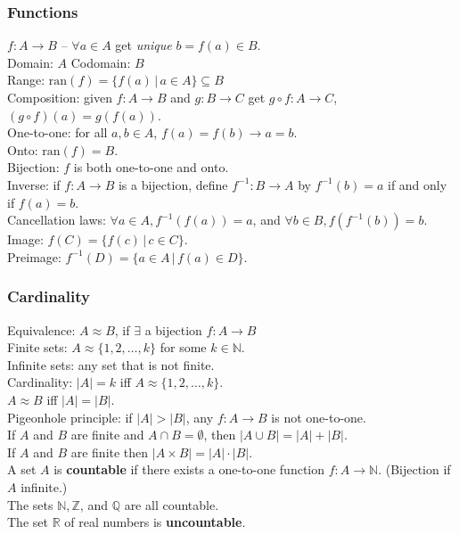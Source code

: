\documentclass[letterpaper,8pt,landscape]{article}
\begin{document}
\begin{multicols}{3}
\subsubsection*{Functions}
$f:A\to B$ -- $\forall a\in A$ get {\em unique} $b=f(a)\in B$.\\
Domain: $A$ \hspace{16pt} Codomain: $B$\\
Range: $\mathrm{ran}(f) = \{f(a)\,|\,a\in A\}\subseteq B$\\
Composition: given $f:A\to B$ and $g:B\to C$ get $g\circ f:A\to C$, $(g\circ f)(a) = g(f(a))$.\\
One-to-one: for all $a,b\in A$, $f(a)=f(b) \to a=b$.\\
Onto: $\mathrm{ran}(f) = B$.\\
Bijection: $f$ is both one-to-one and onto.\\
Inverse: if $f:A\to B$ is a bijection, define $f^{-1}:B\to A$ by $f^{-1}(b)=a$ if and only if $f(a)=b$.\\
Cancellation laws: $\forall a\in A, f^{-1}(f(a))=a$, and $\forall b\in B, f(f^{-1}(b))=b$.\\
Image:  $f(C) = \{f(c)\,|\, c\in C\}$.\\
Preimage: $f^{-1}(D) = \{a\in A\,|\, f(a)\in D\}$.

\subsubsection*{Cardinality}
Equivalence: $A\approx B$, if $\exists$ a bijection $f:A\to B$\\
Finite sets: $A\approx\{1,2,\ldots, k\}$ for some $k\in\mathbb{N}$.\\
Infinite sets: any set that is not finite.\\
Cardinality: $|A| = k$ iff $A\approx \{1,2,\ldots, k\}$.\\
$A\approx B$ iff $|A|=|B|$.\\
Pigeonhole principle: if $|A|>|B|$, any $f:A\to B$ is not one-to-one.\\
If $A$ and $B$ are finite and $A\cap B = \emptyset$, then $|A\cup B| = |A|+|B|$.\\
If $A$ and $B$ are finite then $|A\times B| = |A|\cdot |B|$.\\
A set $A$ is {\bf countable} if there exists a one-to-one function $f:A\to\mathbb{N}$. (Bijection if $A$ infinite.)\\
The sets $\mathbb{N}, \mathbb{Z}$, and $\mathbb{Q}$ are all countable.\\
The set $\mathbb{R}$ of real numbers is {\bf uncountable}.


\end{multicols}
\end{document}
